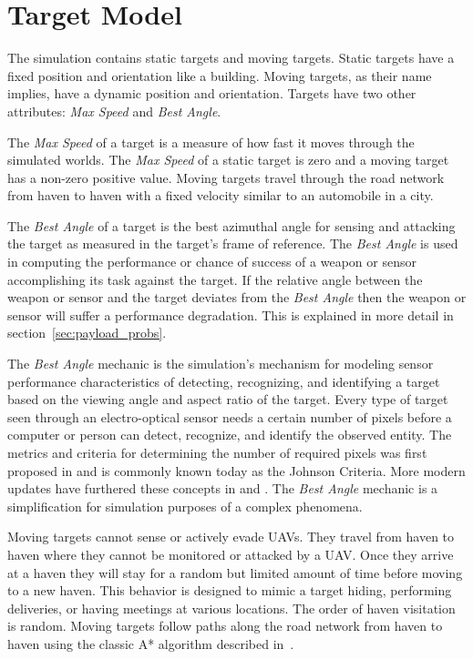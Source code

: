 \section{Target Model}
\label{sec:target_model}
The simulation contains static targets and moving targets.  Static targets have a fixed position and orientation like a building.  Moving targets, as their name implies, have a dynamic position and orientation.  Targets have two other attributes: \textit{Max Speed} and \textit{Best Angle}.

The \textit{Max Speed} of a target is a measure of how fast it moves through the simulated worlds.  The \textit{Max Speed} of a static target is zero and a moving target has a non-zero positive value.  Moving targets travel through the road network from haven to haven with a fixed velocity similar to an automobile in a city.

The \textit{Best Angle} of a target is the best azimuthal angle for sensing and attacking the target as measured in the target's frame of reference.  The \textit{Best Angle} is used in computing the performance or chance of success of a weapon or sensor accomplishing its task against the target.  If the relative angle between the weapon or sensor and the target deviates from the \textit{Best Angle} then the weapon or sensor will suffer a performance degradation.  This is explained in more detail in section~\ref{sec:payload_probs}.  

The \textit{Best Angle} mechanic is the simulation's mechanism for modeling sensor performance characteristics of detecting, recognizing, and identifying a target based on the viewing angle and aspect ratio of the target.  Every type of target seen through an electro-optical sensor needs a certain number of pixels before a computer or person can detect, recognize, and identify the observed entity.  The metrics and criteria for determining the number of required pixels was first proposed in \textcite{johnson_criteria} and is commonly known today as the Johnson Criteria.  More modern updates have furthered these concepts in \textcite{sensor_perf} and \textcite{evolution_johnson_criteria}.  The \textit{Best Angle} mechanic is a simplification for simulation purposes of a complex phenomena.


Moving targets cannot sense or actively evade UAVs.  They travel from haven to haven where they cannot be monitored or attacked by a UAV.  Once they arrive at a haven they will stay for a random but limited amount of time before moving to a new haven.  This behavior is designed to mimic a target hiding, performing deliveries, or having meetings at various locations.  The order of haven visitation is random.  Moving targets follow paths along the road network from haven to haven using the classic A* algorithm described in~\textcite{astar}.

